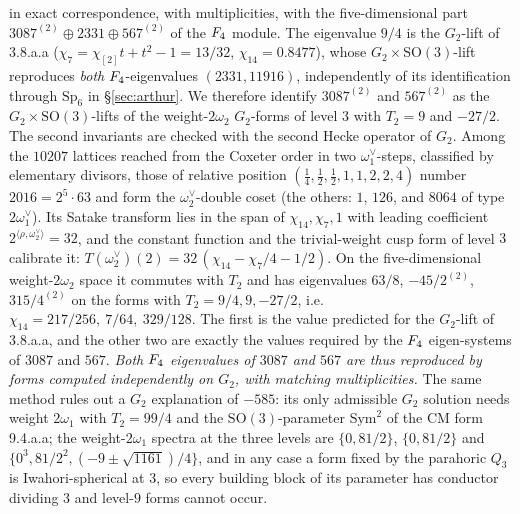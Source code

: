 \documentclass[11pt]{amsart}
\theoremstyle{definition}
\begin{document}
in exact correspondence, with multiplicities, with the five-dimensional part $3087^{(2)}\oplus2331\oplus567^{(2)}$ of the $F_4$ module. The eigenvalue $9/4$ is the $G_2$-lift of \textsf{3.8.a.a} ($\chi_7=\chi_{[2]}t+t^2-1=13/32$, $\chi_{14}=0.8477$), whose $G_2\times\mathrm{SO}(3)$-lift reproduces \emph{both} $F_4$-eigenvalues $(2331,11916)$, independently of its identification through $\mathrm{Sp}_6$ in \S\ref{sec:arthur}. We therefore identify $3087^{(2)}$ and $567^{(2)}$ as the $G_2\times\mathrm{SO}(3)$-lifts of the weight-$2\omega_2$ $G_2$-forms of level $3$ with $T_2=9$ and $-27/2$. The second invariants are checked with the second Hecke operator of $G_2$. Among the $10207$ lattices reached from the Coxeter order in two $\omega_1^\vee$-steps, classified by elementary divisors, those of relative position $(\tfrac14,\tfrac12,\tfrac12,1,1,2,2,4)$ number $2016=2^5\cdot63$ and form the $\omega_2^\vee$-double coset (the others: $1$, $126$, and $8064$ of type $2\omega_1^\vee$). Its Satake transform lies in the span of $\chi_{14},\chi_7,1$ with leading coefficient $2^{\langle\rho,\omega_2^\vee\rangle}=32$, and the constant function and the trivial-weight cusp form of level $3$ calibrate it: $T(\omega_2^\vee)(2)=32\,(\chi_{14}-\chi_7/4-1/2)$. On the five-dimensional weight-$2\omega_2$ space it commutes with $T_2$ and has eigenvalues $63/8$, $-45/2^{(2)}$, $315/4^{(2)}$ on the forms with $T_2=9/4,9,-27/2$, i.e.\ $\chi_{14}=217/256,\ 7/64,\ 329/128$. The first is the value predicted for the $G_2$-lift of \textsf{3.8.a.a}, and the other two are exactly the values required by the $F_4$ eigen-systems of $3087$ and $567$. \emph{Both $F_4$ eigenvalues of $3087$ and $567$ are thus reproduced by forms computed independently on $G_2$, with matching multiplicities.} The same method rules out a $G_2$ explanation of $-585$: its only admissible $G_2$ solution needs weight $2\omega_1$ with $T_2=99/4$ and the $\mathrm{SO}(3)$-parameter $\mathrm{Sym}^2$ of the CM form \textsf{9.4.a.a}; the weight-$2\omega_1$ spectra at the three levels are $\{0,81/2\}$, $\{0,81/2\}$ and $\{0^3,81/2^2,(-9\pm\sqrt{1161})/4\}$, and in any case a form fixed by the parahoric $Q_3$ is Iwahori-spherical at $3$, so every building block of its parameter has conductor dividing $3$ and level-$9$ forms cannot occur.
\end{document}
